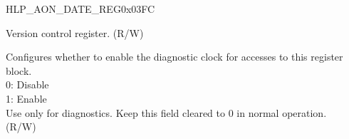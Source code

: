 \begin{register}{H}{LP\_AON\_DATE\_REG}{0x03FC}\label{regdesc:LPAONDATEREG}
%
%
\regnewline%
\begin{regdesc}\begin{reglist}
\label{fielddesc:LPAONDATE}\item [LP\_AON\_DATE] Version control register. (R/W)
\label{fielddesc:LPAONCLKEN}\item [LP\_AON\_CLK\_EN] Configures whether to enable the diagnostic clock for accesses to this register block.\\
0: Disable\\
1: Enable\\
Use only for diagnostics. Keep this field cleared to 0 in normal operation.\\
(R/W)
\end{reglist}\end{regdesc}
\end{register}

